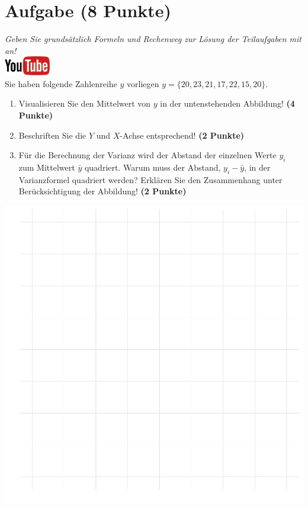 \documentclass[a4paper, 9pt]{scrartcl}\usepackage[]{graphicx}\usepackage[]{xcolor}
\makeatletter
\def\maxwidth{ %
  \ifdim\Gin@nat@width>\linewidth
    \linewidth
  \else
    \Gin@nat@width
  \fi
}
\makeatother
\begin{document}
 
\clearpage

\section{Aufgabe \hfill (8 Punkte)}

\textit{Geben Sie grunds{\"a}tzlich Formeln und Rechenweg zur L{\"o}sung der
  Teilaufgaben mit an!} \\[1Ex]

\hfill\href{https://youtu.be/oMdtYbDInYE}{\includegraphics[width =
  2cm]{img/youtube}}\\[1Ex]

Sie haben folgende Zahlenreihe $y$ vorliegen
$y = \{20, 23, 21, 17, 22, 15, 20\}$.

\begin{enumerate}
\item Visualisieren Sie den Mittelwert von $y$ in der untenstehenden
  Abbildung! \textbf{(4 Punkte)}
\item Beschriften Sie die $Y$ und $X$-Achse entsprechend! \textbf{(2 Punkte)}
\item F{\"u}r die Berechnung der Varianz wird der Abstand der einzelnen Werte $y_i$
  zum Mittelwert $\bar{y}$ quadriert. Warum muss der Abstand, $y_i -
  \bar{y}$, in der Varianzformel quadriert werden?
  Erkl{\"a}ren Sie den Zusammenhang unter Ber{\"u}cksichtigung der Abbildung!
  \textbf{(2 Punkte)}  
\end{enumerate}



{\centering \includegraphics[width=\maxwidth]{img/desc-01-1} 

}
\end{document}
